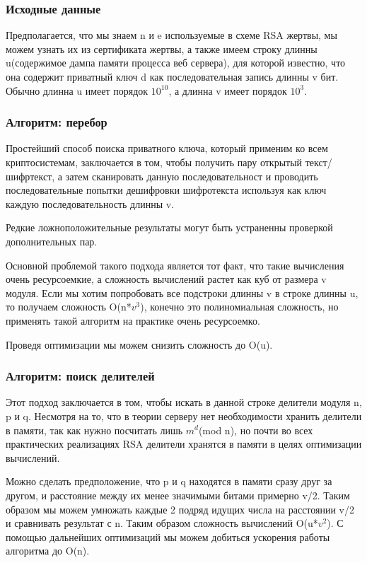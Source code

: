 \documentclass[20pt]{article}
\begin{document}
\subsubsection{Исходные данные}
Предполагается, что мы знаем n и e используемые в схеме RSA жертвы, мы можем
узнать их из сертификата жертвы, а также имеем строку длинны u(содержимое дампа
памяти процесса веб сервера), для которой известно, что она содержит приватный
ключ d как последовательная запись длинны v бит. Обычно длинна u имеет порядок
$10^10$, а длинна v имеет порядок $10^3$.

\subsubsection{Алгоритм: перебор}
Простейший способ поиска приватного ключа, который применим ко всем
криптосистемам, заключается в том, чтобы получить пару открытый текст/шифртекст,
а затем сканировать данную последовательност и проводить последовательные попытки
дешифровки шифротекста используя как ключ каждую последовательность длинны v.

Редкие ложноположительные результаты могут быть устраненны проверкой
дополнительных пар.

Основной проблемой такого подхода является тот факт, что такие вычисления очень
ресурсоемкие, а сложность вычислений растет как куб от размера v модуля. Если мы
хотим попробовать все подстроки длинны v в строке длинны u, то получаем сложность
O(n*$v^3$), конечно это полиномиальная сложность, но применять такой алгоритм
на практике очень ресурсоемко.

Проведя оптимизации мы можем снизить сложность до O(u).

\subsubsection{Алгоритм: поиск делителей}
Этот подход заключается в том, чтобы искать в данной строке делители модуля n,
p и q. Несмотря на то, что в теории серверу нет необходимости хранить делители в
памяти, так как нужно посчитать лишь $m^d$(mod n), но почти во всех практических
реализациях RSA делители хранятся в памяти в целях оптимизации вычислений.

Можно сделать предположение, что p и q находятся в памяти сразу друг за другом,
и расстояние между их менее значимыми битами примерно v/2. Таким образом мы можем
умножать каждые 2 подряд идущих числа на расстоянии v/2 и сравнивать результат с
n. Таким образом сложность вычислений O(u*$v^2$). С помощью дальнейших оптимизаций
мы можем добиться ускорения работы алгоритма до O(n).
\end{document}
